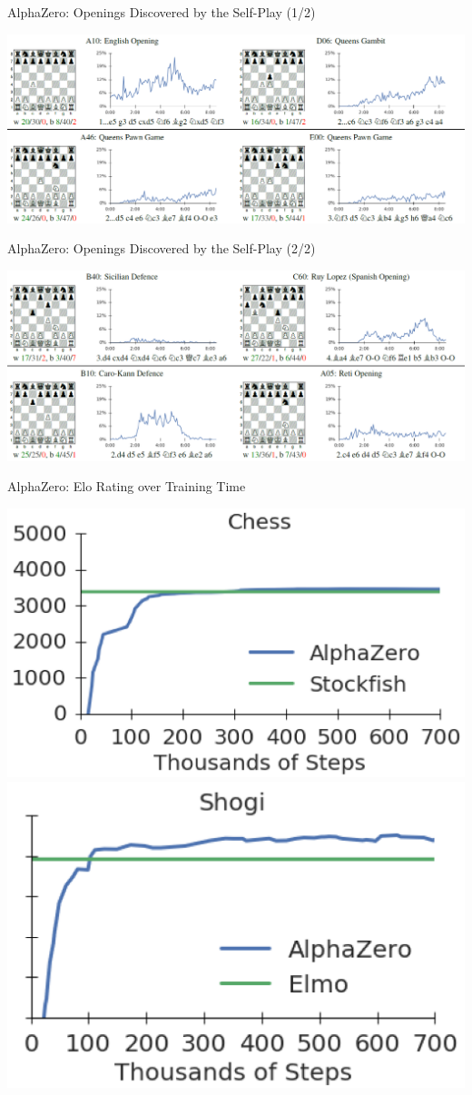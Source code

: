 \documentclass{beamer}
\begin{document}
  {

    \begin{frame}{AlphaZero: Openings Discovered by the Self-Play (1/2)}
      \begin{center}
        \includegraphics[width=\textwidth]{../img/AlphaZero-paper/openings-1.png}
      \end{center}
    \end{frame}

    \begin{frame}{AlphaZero: Openings Discovered by the Self-Play (2/2)}
      \begin{center}
        \includegraphics[width=\textwidth]{../img/AlphaZero-paper/openings-2.png}
      \end{center}
    \end{frame}

    \begin{frame}{AlphaZero: Elo Rating over Training Time}
      \begin{center}
        \pause
        \includegraphics[width=.5\textwidth]{../img/AlphaZero-paper/elo-vs-training-chess.png}
        \pause
        \includegraphics[width=.5\textwidth]{../img/AlphaZero-paper/elo-vs-training-shogi.png}


\end{center}
\end{frame}}
\end{document}

